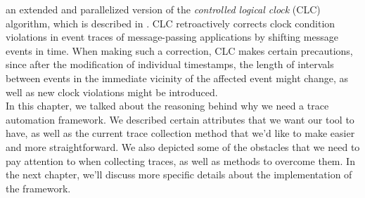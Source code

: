 an extended and parallelized version of the \emph{controlled logical
clock} (CLC) algorithm, which is described in \cite{brwl09}. CLC
retroactively corrects clock condition violations in event traces of
message-passing applications by shifting message events in time. When
making such a correction, CLC makes certain precautions, since
after the modification of individual timestamps, the length of
intervals between events in the immediate vicinity of the affected
event might change, as well as new clock violations might be
introduced.\\[0.5cm]
In this chapter, we talked about the reasoning behind why we need a
trace automation framework. We described certain attributes that we
want our tool to have, as well as the current trace collection method
that we'd like to make easier and more straightforward. We also
depicted some of the obstacles that we need to pay attention to when
collecting traces, as well as methods to overcome them. In the next
chapter, we'll discuss more specific details about the implementation
of the framework.
